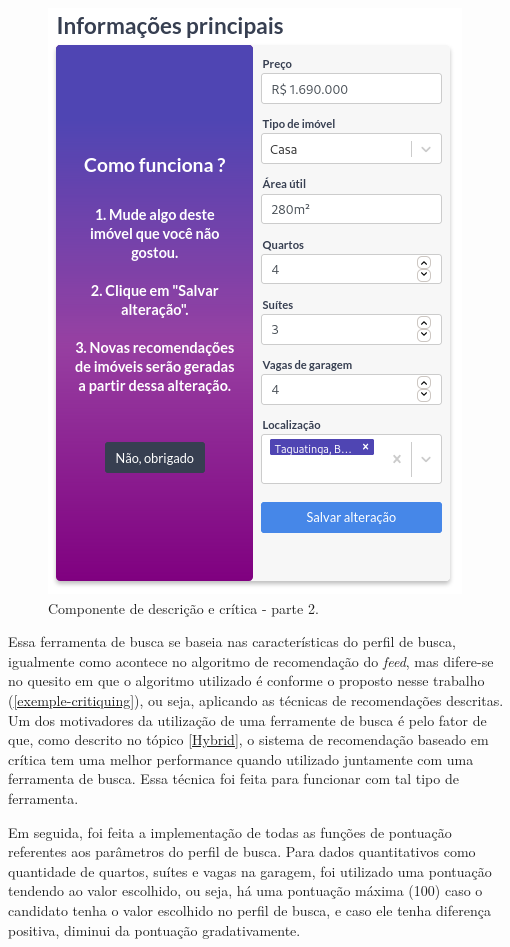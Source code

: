 \begin{figure}[H]
    \centering
    \includegraphics[scale=0.45]{figuras/desenvolvimento/componente_critica2.png}
    \caption[Componente de descrição e crítica - parte 2]{Componente de descrição e crítica - parte 2.}
    \label{fig:componente_critica2}
\end{figure}

Essa ferramenta de busca se baseia nas características do perfil de busca, igualmente como acontece no algoritmo de recomendação do \textit{feed}, mas difere-se no quesito em que o algoritmo utilizado é conforme o proposto nesse trabalho (\ref{exemple-critiquing}), ou seja, aplicando as técnicas de recomendações descritas. Um dos motivadores da utilização de uma ferramente de busca é pelo fator de que, como descrito no tópico \ref{Hybrid}, o sistema de recomendação baseado em crítica tem uma melhor performance quando utilizado juntamente com uma ferramenta de busca. Essa técnica foi feita para funcionar com tal tipo de ferramenta.

Em seguida, foi feita a implementação de todas as funções de pontuação referentes aos parâmetros do perfil de busca. Para dados quantitativos como quantidade de quartos, suítes e vagas na garagem, foi utilizado uma pontuação tendendo ao valor escolhido, ou seja, há uma pontuação máxima (100) caso o candidato tenha o valor escolhido no perfil de busca, e caso ele tenha diferença positiva, diminui da pontuação gradativamente.


